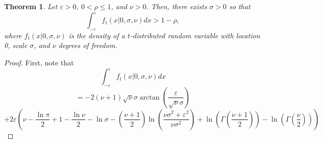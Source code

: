 \documentclass{article}
\newtheorem{theorem}{Theorem}
\newcommand{\ep}{\varepsilon}
\begin{document}
\begin{theorem}
	Let $\ep > 0$, $0 < \rho \leq 1$, and $\nu > 0$. Then, there exists $\sigma > 0$ so that
	$$\int_{-\ep}^\ep f_t(x | 0, \sigma, \nu) dx > 1 - \rho,$$
	where $f_t(x | 0, \sigma, \nu)$ is the density of a $t$-distributed random variable with location 0, scale $\sigma$, and $\nu$ degrees of freedom.
\end{theorem}
\begin{proof}
	First, note that
	$$\int_{-\ep}^\ep f_t(x | 0, \sigma, \nu) dx$$
	$$= -2(\nu + 1)\sqrt{\nu}\sigma \arctan\left(\frac{\ep}{\sqrt{\nu}\sigma}\right)$$
	$$+ 2\ep\left(\nu - \frac{\ln\pi}{2} + 1 - \frac{\ln\nu}{2} - \ln\sigma - \left(\frac{\nu + 1}{2}\right)\ln\left(\frac{\nu\sigma^2 + \ep^2}{\nu\sigma^2}\right) + \ln\left(\Gamma\left(\frac{\nu + 1}{2}\right)\right) - \ln\left(\Gamma\left(\frac{\nu}{2}\right)\right)\right)$$
\end{proof}
\end{document}
